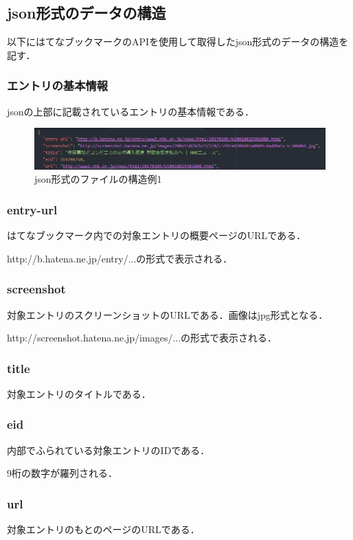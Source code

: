 \subsection{json形式のデータの構造}
以下にはてなブックマークのAPIを使用して取得したjson形式のデータの構造を記す．

\subsubsection{エントリの基本情報}
jsonの上部に記載されているエントリの基本情報である．

\begin{figure}[htb]
\centering
\includegraphics[width=13cm]{json1.PNG}
\caption{json形式のファイルの構造例1}\label{json1}
\end{figure}

\subsubsection{entry-url}
はてなブックマーク内での対象エントリの概要ページのURLである．\par
http://b.hatena.ne.jp/entry/...の形式で表示される．
\subsubsection{screenshot}
対象エントリのスクリーンショットのURLである．画像はjpg形式となる．  \par
http://screenshot.hatena.ne.jp/images/...の形式で表示される．
\subsubsection{title}
対象エントリのタイトルである．
\subsubsection{eid}
内部でふられている対象エントリのIDである．\par
9桁の数字が羅列される．
\subsubsection{url}
対象エントリのもとのページのURLである．

\newpage

